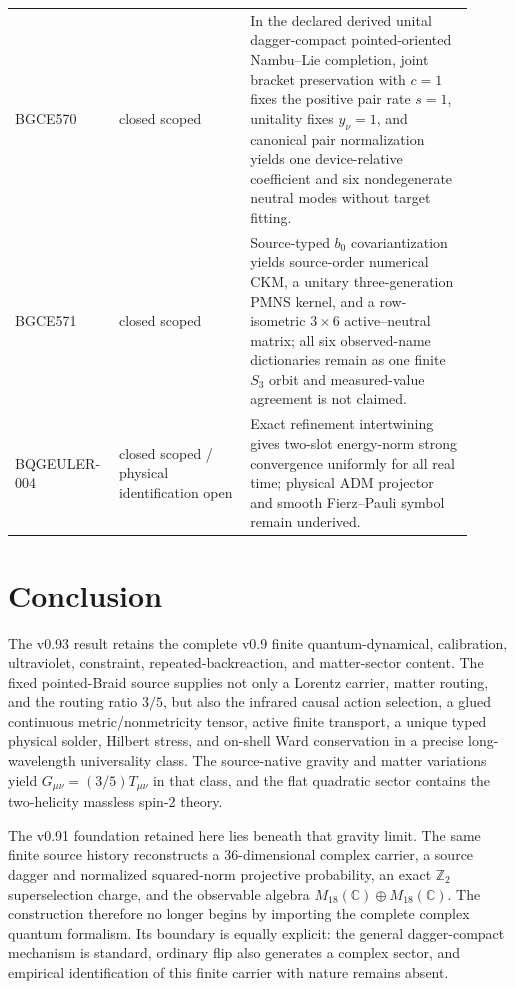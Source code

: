 \documentclass[11pt]{article}
\theoremstyle{definition}
\theoremstyle{remark}
\begin{document}
\begin{longtable}{>{\raggedright\arraybackslash}p{0.18\linewidth} >{\raggedright\arraybackslash}p{0.27\linewidth} >{\raggedright\arraybackslash}p{0.46\linewidth}}
BGCE570 & closed scoped & In the declared derived unital dagger-compact pointed-oriented Nambu--Lie completion, joint bracket preservation with $c=1$ fixes the positive pair rate $s=1$, unitality fixes $y_\nu=1$, and canonical pair normalization yields one device-relative coefficient and six nondegenerate neutral modes without target fitting. \\
BGCE571 & closed scoped & Source-typed $b_0$ covariantization yields source-order numerical CKM, a unitary three-generation PMNS kernel, and a row-isometric $3\times6$ active--neutral matrix; all six observed-name dictionaries remain as one finite $S_3$ orbit and measured-value agreement is not claimed. \\
BQGEULER-004 & closed scoped / physical identification open & Exact refinement intertwining gives two-slot energy-norm strong convergence uniformly for all real time; physical ADM projector and smooth Fierz--Pauli symbol remain underived. \\
\bottomrule
\end{longtable}

\section{Conclusion}

The v0.93 result retains the complete v0.9 finite quantum-dynamical, calibration, ultraviolet, constraint, repeated-backreaction, and matter-sector content. The fixed pointed-Braid source supplies not only a Lorentz carrier, matter routing, and the routing ratio $3/5$, but also the infrared causal action selection, a glued continuous metric/nonmetricity tensor, active finite transport, a unique typed physical solder, Hilbert stress, and on-shell Ward conservation in a precise long-wavelength universality class. The source-native gravity and matter variations yield $G_{\mu\nu}=(3/5)T_{\mu\nu}$ in that class, and the flat quadratic sector contains the two-helicity massless spin-2 theory.

The v0.91 foundation retained here lies beneath that gravity limit. The same finite source history reconstructs a 36-dimensional complex carrier, a source dagger and normalized squared-norm projective probability, an exact $\mathbb Z_2$ superselection charge, and the observable algebra $M_{18}(\mathbb C)\oplus M_{18}(\mathbb C)$. The construction therefore no longer begins by importing the complete complex quantum formalism. Its boundary is equally explicit: the general dagger-compact mechanism is standard, ordinary flip also generates a complex sector, and empirical identification of this finite carrier with nature remains absent.
\end{document}
